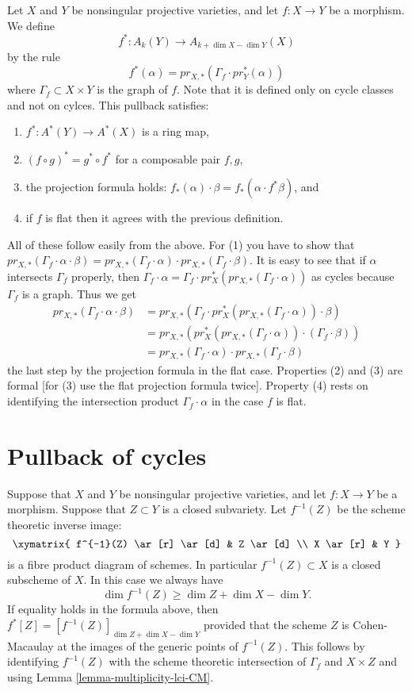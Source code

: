 \noindent
Let $X$ and $Y$ be nonsingular projective varieties,
and let $f : X \to Y$ be a morphism. We define 
$$
f^* : A_k(Y) \to A_{k+\dim X - \dim Y}(X)
$$
by the rule
$$
f^*(\alpha) = pr_{X,*}(\Gamma_f \cdot pr_{Y}^*(\alpha))
$$
where $\Gamma_f \subset X\times Y$ is the graph of $f$.
Note that it is defined only on cycle classes and not
on cylces. This pullback satisfies:
\begin{enumerate}
\item $f^* : A^*(Y) \to A^*(X)$ is a ring map,
\item $(f \circ g)^* = g^* \circ f^*$ for a composable
pair $f,g$,
\item the projection formula holds: $f_*(\alpha) \cdot \beta =
f_*( \alpha \cdot f^*\beta)$, and
\item if $f$ is flat then it agrees with the previous definition.
\end{enumerate}
All of these follow easily from the above. For (1) you have to show that
$pr_{X,*}( \Gamma_f \cdot \alpha \cdot \beta) =
pr_{X,*}(\Gamma_f \cdot \alpha) \cdot
pr_{X,*}(\Gamma_f \cdot \beta)$. It is easy to see that
if $\alpha$ intersects $\Gamma_f$ properly, then
$\Gamma_f \cdot \alpha =  
\Gamma_f \cdot pr_X^*(pr_{X,*}(\Gamma_f \cdot \alpha))$ as cycles
because $\Gamma_f$ is a graph. Thus we get
\begin{align*}
pr_{X,*}( \Gamma_f \cdot \alpha \cdot \beta)
& = pr_{X,*}( \Gamma_f \cdot
pr_X^*(pr_{X,*}(\Gamma_f \cdot \alpha)) \cdot \beta) \\
& =
pr_{X,*}( pr_X^*(pr_{X,*}(\Gamma_f \cdot \alpha))
\cdot (\Gamma_f \cdot \beta)) \\
& =
pr_{X,*}(\Gamma_f \cdot \alpha) \cdot pr_{X,*}(\Gamma_f \cdot \beta)
\end{align*}
the last step by the projection formula in the flat case. Properties
(2) and (3) are formal [for (3) use the flat projection formula twice].
Property (4) rests on identifying the intersection product
$\Gamma_f \cdot \alpha$ in the case $f$ is flat.


\section{Pullback of cycles}
\label{section-pullback-cycles}

\noindent
Suppose that $X$ and $Y$ be nonsingular
projective varieties, and let $f : X \to Y$ be a morphism. 
Suppose that $Z \subset Y$ is a closed subvariety. Let $f^{-1}(Z)$
be the scheme theoretic inverse image:
$$
\xymatrix{
f^{-1}(Z) \ar[r] \ar[d] & Z \ar[d] \\
X \ar[r] & Y
}
$$
is a fibre product diagram of schemes. In particular $f^{-1}(Z) \subset X$
is a closed subscheme of $X$. In this case we always have
$$
\dim f^{-1}(Z) \geq \dim Z + \dim X - \dim Y.
$$
If equality holds in the formula above, then
$f^*[Z] = [f^{-1}(Z)]_{\dim Z + \dim X - \dim Y}$
provided that the scheme $Z$ is Cohen-Macaulay at the images
of the generic points of $f^{-1}(Z)$. This follows by identifying
$f^{-1}(Z)$ with the scheme theoretic intersection of $\Gamma_f$
and $X \times Z$ and using Lemma \ref{lemma-multiplicity-lci-CM}.












